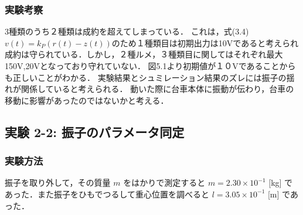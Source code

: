 \subsubsection{実験考察}
3種類のうち２種類は成約を超えてしまっている．
これは，式(3.4)\(v(t) = k_P \left( r(t) - z(t) \right)\)のため１種類目は初期出力は10Vであると考えられ
成約は守られている．しかし，２種ルメ，３種類目に関してはそれぞれ最大150V,20Vとなっており守れていない．
図5.1より初期値が１０Vであることからも正しいことがわかる．
実験結果とシュミレーション結果のズレには振子の揺れが関係していると考えられる．
動いた際に台車本体に振動が伝わり，台車の移動に影響があったのではないかと考える．



\subsection{実験 2-2: 振子のパラメータ同定}
\subsubsection{実験方法}

振子を取り外して，その質量 \( m \) をはかりで測定すると \( m = 2.30 \times 10^{-1} \) [kg] であった．また振子をひもでつるして重心位置を調べると \( l = 3.05 \times 10^{-1} \) [m] であった．

